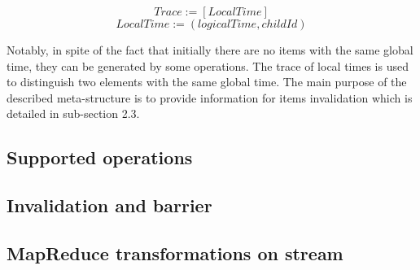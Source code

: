 \[Trace := [LocalTime]\]
\[LocalTime := (logicalTime, childId)\]

Notably, in spite of the fact that initially there are no items with the same global time, they can be generated by some operations. The trace of local times is used to distinguish two elements with the same global time. The main purpose of the described meta-structure is to provide information for items invalidation which is detailed in sub-section 2.3.

\subsection{Supported operations}

\subsection{Invalidation and barrier}

\subsection{MapReduce transformations on stream}





